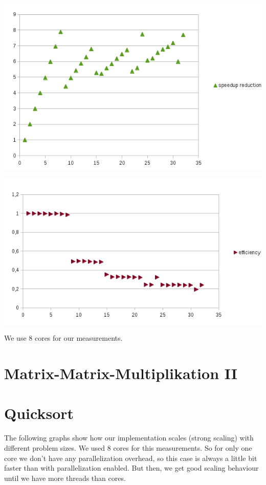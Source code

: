 \documentclass[a4paper,10pt]{article}
\begin{document}
\begin{center}
\includegraphics[]{pi_speedup.png}
\end{center}
\begin{center}
\includegraphics[]{pi_efficiency.png}
\end{center}
We use 8 cores for our measurements.

\section{Matrix-Matrix-Multiplikation II}

\section{Quicksort}
The following graphs show how our implementation scales (strong scaling) with different problem sizes. We used 8 cores for this measurements. So for only one core we don't have any parallelization overhead, so this case is always a little bit faster than with parallelization enabled. But then, we get good scaling behaviour until we have more threads than cores.
\end{document}
